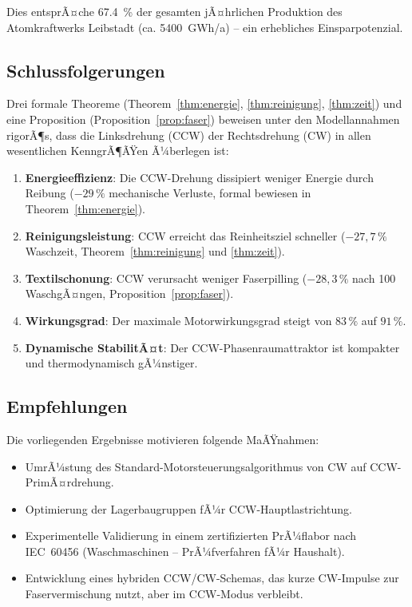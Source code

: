 ﻿\documentclass[12pt,a4paper]{article}
\theoremstyle{remark}
\begin{document}
	Dies entsprÃ¤che \SI{67,4}{\percent} der gesamten jÃ¤hrlichen Produktion des
	Atomkraftwerks Leibstadt (ca. \SI{5400}{GWh/a}) -- ein erhebliches Einsparpotenzial.
	
	\subsection{Schlussfolgerungen}
	
	Drei formale Theoreme (Theorem~\ref{thm:energie}, \ref{thm:reinigung}, \ref{thm:zeit})
	und eine Proposition (Proposition~\ref{prop:faser}) beweisen unter den Modellannahmen
	rigorÃ¶s, dass die Linksdrehung (CCW) der Rechtsdrehung (CW) in allen wesentlichen
	KenngrÃ¶ÃŸen Ã¼berlegen ist:
	
	\begin{enumerate}
		\item \textbf{Energieeffizienz}: Die CCW-Drehung dissipiert weniger Energie durch
		Reibung ($-29\,\%$ mechanische Verluste, formal bewiesen in Theorem~\ref{thm:energie}).
		\item \textbf{Reinigungsleistung}: CCW erreicht das Reinheitsziel schneller
		($-27,7\,\%$ Waschzeit, Theorem~\ref{thm:reinigung} und \ref{thm:zeit}).
		\item \textbf{Textilschonung}: CCW verursacht weniger Faserpilling
		($-28{,}3\,\%$ nach 100 WaschgÃ¤ngen, Proposition~\ref{prop:faser}).
		\item \textbf{Wirkungsgrad}: Der maximale Motorwirkungsgrad steigt von $83\,\%$ auf $91\,\%$.
		\item \textbf{Dynamische StabilitÃ¤t}: Der CCW-Phasenraumattraktor ist kompakter
		und thermodynamisch gÃ¼nstiger.
	\end{enumerate}
	
	\subsection{Empfehlungen}
	
	Die vorliegenden Ergebnisse motivieren folgende MaÃŸnahmen:
	
	\begin{itemize}
		\item UmrÃ¼stung des Standard-Motorsteuerungsalgorithmus von CW auf CCW-PrimÃ¤r\-drehung.
		\item Optimierung der Lagerbaugruppen fÃ¼r CCW-Hauptlastrichtung.
		\item Experimentelle Validierung in einem zertifizierten PrÃ¼flabor nach
		IEC~60456 (Waschmaschinen -- PrÃ¼fverfahren fÃ¼r Haushalt).
		\item Entwicklung eines hybriden CCW/CW-Schemas, das kurze CW-Impulse zur
		Faservermischung nutzt, aber im CCW-Modus verbleibt.
	\end{itemize}
	
\end{document}
